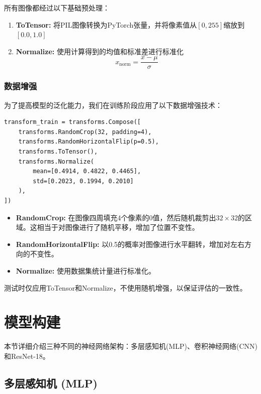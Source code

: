 \documentclass[12pt,a4paper]{article}
\begin{document}
所有图像都经过以下基础预处理：
\begin{enumerate}[leftmargin=2em]
    \item \textbf{ToTensor:} 将PIL图像转换为PyTorch张量，并将像素值从$[0, 255]$缩放到$[0.0, 1.0]$
    \item \textbf{Normalize:} 使用计算得到的均值和标准差进行标准化
    \begin{equation}
        x_{\text{norm}} = \frac{x - \mu}{\sigma}
    \end{equation}
\end{enumerate}

\subsubsection{数据增强}

为了提高模型的泛化能力，我们在训练阶段应用了以下数据增强技术：

\begin{lstlisting}[caption={数据增强配置},label={lst:augmentation}]
transform_train = transforms.Compose([
    transforms.RandomCrop(32, padding=4),
    transforms.RandomHorizontalFlip(p=0.5),
    transforms.ToTensor(),
    transforms.Normalize(
        mean=[0.4914, 0.4822, 0.4465],
        std=[0.2023, 0.1994, 0.2010]
    ),
])
\end{lstlisting}

\begin{itemize}[leftmargin=2em]
    \item \textbf{RandomCrop:} 在图像四周填充4个像素的0值，然后随机裁剪出$32 \times 32$的区域。这相当于对图像进行了随机平移，增加了位置不变性。
    \item \textbf{RandomHorizontalFlip:} 以0.5的概率对图像进行水平翻转，增加对左右方向的不变性。
    \item \textbf{Normalize:} 使用数据集统计量进行标准化。
\end{itemize}

测试时仅应用ToTensor和Normalize，不使用随机增强，以保证评估的一致性。

\section{模型构建}

本节详细介绍三种不同的神经网络架构：多层感知机(MLP)、卷积神经网络(CNN)和ResNet-18。

\subsection{多层感知机 (MLP)}
\end{document}
